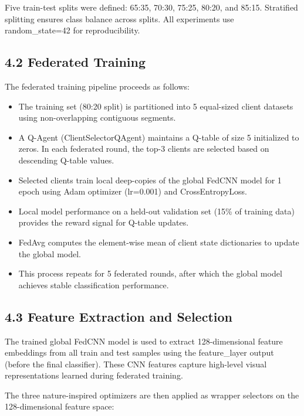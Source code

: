 \documentclass[
]{article}
\begin{document}
Five train-test splits were defined: 65:35, 70:30, 75:25, 80:20, and
85:15. Stratified splitting ensures class balance across splits. All
experiments use random\_state=42 for reproducibility.

\hypertarget{federated-training}{%
\subsection{4.2 Federated Training}\label{federated-training}}

The federated training pipeline proceeds as follows:

\begin{itemize}
\item
  The training set (80:20 split) is partitioned into 5 equal-sized
  client datasets using non-overlapping contiguous segments.
\item
  A Q-Agent (ClientSelectorQAgent) maintains a Q-table of size 5
  initialized to zeros. In each federated round, the top-3 clients are
  selected based on descending Q-table values.
\item
  Selected clients train local deep-copies of the global FedCNN model
  for 1 epoch using Adam optimizer (lr=0.001) and CrossEntropyLoss.
\item
  Local model performance on a held-out validation set (15\% of training
  data) provides the reward signal for Q-table updates.
\item
  FedAvg computes the element-wise mean of client state dictionaries to
  update the global model.
\item
  This process repeats for 5 federated rounds, after which the global
  model achieves stable classification performance.
\end{itemize}

\hypertarget{feature-extraction-and-selection}{%
\subsection{4.3 Feature Extraction and
Selection}\label{feature-extraction-and-selection}}

The trained global FedCNN model is used to extract 128-dimensional
feature embeddings from all train and test samples using the
feature\_layer output (before the final classifier). These CNN features
capture high-level visual representations learned during federated
training.

The three nature-inspired optimizers are then applied as wrapper
selectors on the 128-dimensional feature space:
\end{document}
